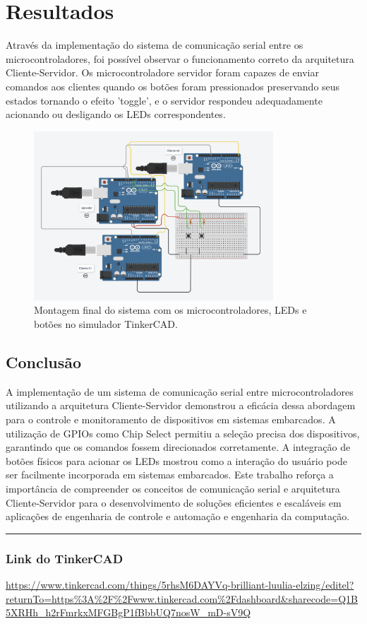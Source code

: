 \documentclass[12pt, a4paper]{article}
\begin{document}
\section{Resultados}
Através da implementação do sistema de comunicação serial entre os microcontroladores, foi possível observar o funcionamento correto da arquitetura Cliente-Servidor. Os microcontroladore servidor foram capazes de enviar comandos aos clientes quando os botões foram pressionados preservando seus estados tornando o efeito 'toggle', e o servidor respondeu adequadamente acionando ou desligando os LEDs correspondentes.
\begin{figure}[H]
	\centering
	\includegraphics[width=0.8\textwidth]{arduino.png}
	\caption{Montagem final do sistema com os microcontroladores, LEDs e botões no simulador TinkerCAD.}
	\label{fig:resultado}
\end{figure}

\newpage
\begin{center}
	\section{Conclusão}
\end{center}

A implementação de um sistema de comunicação serial entre microcontroladores utilizando a arquitetura Cliente-Servidor demonstrou a eficácia dessa abordagem para o controle e monitoramento de dispositivos em sistemas embarcados. A utilização de GPIOs como Chip Select permitiu a seleção precisa dos dispositivos, garantindo que os comandos fossem direcionados corretamente. A integração de botões físicos para acionar os LEDs mostrou como a interação do usuário pode ser facilmente incorporada em sistemas embarcados. Este trabalho reforça a importância de compreender os conceitos de comunicação serial e arquitetura Cliente-Servidor para o desenvolvimento de soluções eficientes e escaláveis em aplicações de engenharia de controle e automação e engenharia da computação.

\rule{\textwidth}{0.4pt}
\subsubsection{Link do TinkerCAD}
\url{https://www.tinkercad.com/things/5rhsM6DAYVq-brilliant-luulia-elzing/editel?returnTo=https%3A%2F%2Fwww.tinkercad.com%2Fdashboard&sharecode=Q1B5XRHh_h2rFmrkxMFGBgP1fBbbUQ7nosW_mD-sV9Q}
\end{document}
